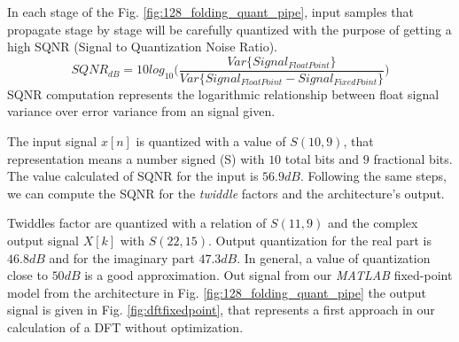 \documentclass[journal,comsoc]{IEEEtran}
\begin{document}
In each stage of the Fig. \ref{fig:128_folding_quant_pipe}, input samples that propagate stage by stage will be carefully quantized with the purpose of getting a high SQNR (Signal to Quantization Noise Ratio).
\begin{equation*}%
SQNR_{dB} = 10log_{10} \bigg(  \frac{  Var\{Signal_{FloatPoint}\}  }{  Var\{Signal_{FloatPoint} - Signal_{FixedPoint}\}}  \bigg)
\end{equation*}
SQNR computation represents the logarithmic relationship between float signal variance over error variance from an signal given.

The input signal $x[n]$ is quantized with a value of $S(10,9)$, that representation means a number signed (S) with $10$ total bits and $9$ fractional bits. The value calculated of SQNR for the input is $56.9dB$. Following the same steps, we can compute the SQNR for the \textit{twiddle} factors and the architecture's output.

Twiddles factor are quantized with a relation of $S(11,9)$ and the complex output signal $X[k]$ with $S(22,15)$. Output quantization for the real part is $46.8dB$ and for the imaginary part $47.3dB$. In general, a value of quantization close to $50dB$ is a good approximation. Out signal from our \textit{MATLAB} fixed-point model from the architecture in Fig. \ref{fig:128_folding_quant_pipe} the output signal is given in Fig. \ref{fig:dftfixedpoint}, that represents a first approach in our calculation of a DFT without optimization.
\end{document}
